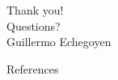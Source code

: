 \documentclass{beamer}
\begin{document}
\begin{frame}
  \begin{center}
    \Huge Thank you! \\
    \huge Questions? \\
    \Large Guillermo Echegoyen
  \end{center}
\end{frame}

\begin{frame}[allowframebreaks]{References}
  
  
\end{frame}
\end{document}
